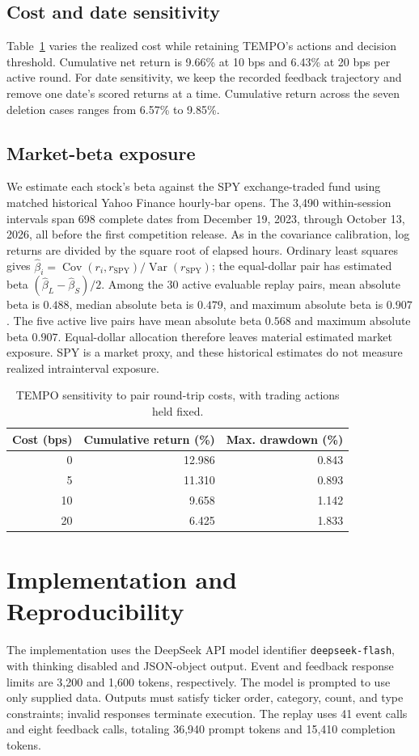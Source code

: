 \documentclass[conference]{IEEEtran}
\begin{document}
\subsection{Cost and date sensitivity}
Table~\ref{tab:cost} varies the realized cost while retaining TEMPO's actions and decision threshold. Cumulative net return is 9.66\% at 10 bps and 6.43\% at 20 bps per active round. For date sensitivity, we keep the recorded feedback trajectory and remove one date's scored returns at a time. Cumulative return across the seven deletion cases ranges from 6.57\% to 9.85\%.

\subsection{Market-beta exposure}
We estimate each stock's beta against the SPY exchange-traded fund using matched historical Yahoo Finance hourly-bar opens. The 3,490 within-session intervals span 698 complete dates from December 19, 2023, through October 13, 2026, all before the first competition release. As in the covariance calibration, log returns are divided by the square root of elapsed hours. Ordinary least squares gives $\widehat\beta_i=\operatorname{Cov}(r_i,r_{\mathrm{SPY}})/\operatorname{Var}(r_{\mathrm{SPY}})$; the equal-dollar pair has estimated beta $(\widehat\beta_L-\widehat\beta_S)/2$. Among the 30 active evaluable replay pairs, mean absolute beta is $0.488$, median absolute beta is $0.479$, and maximum absolute beta is $0.907$. The five active live pairs have mean absolute beta $0.568$ and maximum absolute beta $0.907$. Equal-dollar allocation therefore leaves material estimated market exposure. SPY is a market proxy, and these historical estimates do not measure realized intrainterval exposure.

\begin{table}[!tb]
\centering
\caption{TEMPO sensitivity to pair round-trip costs, with trading actions held fixed.}
\label{tab:cost}
\begin{tabular}{rrr}
\toprule
Cost (bps) & Cumulative return (\%) & Max. drawdown (\%)\\
\midrule
0 & 12.986 & 0.843\\
5 & 11.310 & 0.893\\
10 & 9.658 & 1.142\\
20 & 6.425 & 1.833\\
\bottomrule
\end{tabular}
\end{table}

\section{Implementation and Reproducibility}
The implementation uses the DeepSeek API model identifier \texttt{deepseek-flash}, with thinking disabled and JSON-object output. Event and feedback response limits are 3,200 and 1,600 tokens, respectively. The model is prompted to use only supplied data. Outputs must satisfy ticker order, category, count, and type constraints; invalid responses terminate execution. The replay uses 41 event calls and eight feedback calls, totaling 36,940 prompt tokens and 15,410 completion tokens.
\end{document}
